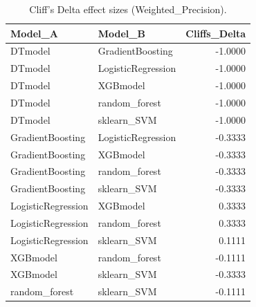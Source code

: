 \begin{table}[t]
\centering
\begin{tabular}{llr}
\toprule
Model_A & Model_B & Cliffs_Delta \\
\midrule
DTmodel & GradientBoosting & -1.0000 \\
DTmodel & LogisticRegression & -1.0000 \\
DTmodel & XGBmodel & -1.0000 \\
DTmodel & random_forest & -1.0000 \\
DTmodel & sklearn_SVM & -1.0000 \\
GradientBoosting & LogisticRegression & -0.3333 \\
GradientBoosting & XGBmodel & -0.3333 \\
GradientBoosting & random_forest & -0.3333 \\
GradientBoosting & sklearn_SVM & -0.3333 \\
LogisticRegression & XGBmodel & 0.3333 \\
LogisticRegression & random_forest & 0.3333 \\
LogisticRegression & sklearn_SVM & 0.1111 \\
XGBmodel & random_forest & -0.1111 \\
XGBmodel & sklearn_SVM & -0.3333 \\
random_forest & sklearn_SVM & -0.1111 \\
\bottomrule
\end{tabular}
\caption{Cliff's Delta effect sizes (Weighted_Precision).}
\label{tab:cliffs_Weighted_Precision}
\end{table}